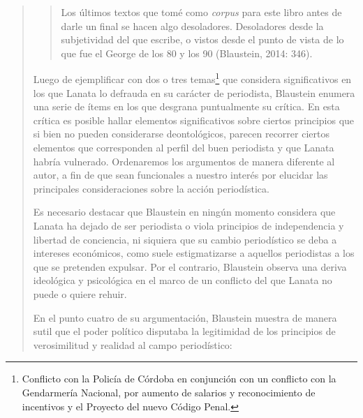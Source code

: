 \begin{quote}
\begin{quote}
	Los últimos textos que tomé como \emph{corpus} para este libro antes de darle un final se hacen algo desoladores. Desoladores desde la subjetividad del que escribe, o vistos desde el punto de vista de lo que fue el George de los 80 y los 90 (Blaustein, 2014: 346).
\end{quote}


Luego de ejemplificar con dos o tres temas\footnote{Conflicto con la Policía de Córdoba en conjunción con un conflicto con la Gendarmería Nacional, por aumento de salarios y reconocimiento de incentivos y el Proyecto del nuevo Código Penal.} que considera significativos en los que Lanata lo defrauda en su carácter de periodista, Blaustein enumera una serie de ítems en los que desgrana puntualmente su crítica. En esta crítica es posible hallar elementos significativos sobre ciertos principios que si bien no pueden considerarse deontológicos, parecen recorrer ciertos elementos que corresponden al perfil del buen periodista y que Lanata habría vulnerado. Ordenaremos los argumentos de manera diferente al autor, a fin de que sean funcionales a nuestro interés por elucidar las principales consideraciones sobre la acción periodística.

Es necesario destacar que Blaustein en ningún momento considera que Lanata ha dejado de ser periodista o viola principios de independencia y libertad de conciencia, ni siquiera que su cambio periodístico se deba a intereses económicos, como suele estigmatizarse a aquellos periodistas a los que se pretenden expulsar. Por el contrario, Blaustein observa una deriva ideológica y psicológica en el marco de un conflicto del que Lanata no puede o quiere rehuir.

En el punto cuatro de su argumentación, Blaustein muestra de manera sutil que el poder político disputaba la legitimidad de los principios de verosimilitud y realidad al campo periodístico:


\end{quote}
